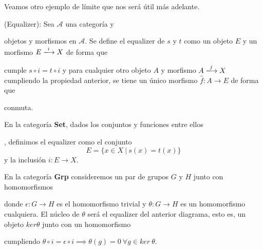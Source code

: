 Veamos otro ejemplo de límite que nos será útil más adelante. 

\begin{definicion}
    (Equalizer): Sea $\mathscr{A}$ una categoría y  objetos y morfismos en $\mathscr{A}$. Se define el equalizer de $s$ y $t$ como un objeto $E$ y un morfismo $E \xlongrightarrow{i} X$ de forma que   cumple $s \circ i = t \circ i$ y para cualquier otro objeto $A$ y morfismo $A \xlongrightarrow{j} X$ cumpliendo la propiedad anterior, se tiene un único morfismo $\hat{f}: A \longrightarrow E$ de forma que

    \begin{center}
    \end{center}
    conmuta.
\end{definicion}

\begin{ejemplo}
    En la categoría \textbf{Set}, dados los conjuntos y funciones entre ellos , definimos el equalizer como el conjunto \begin{equation}
        E = \{x \in X \ | \ s(x) = t(x)\}
    \end{equation} y la inclusión $i: E \longrightarrow X$. 
\end{ejemplo}

\begin{ejemplo}
    En la categoría \textbf{Grp} consideremos un par de grupos $G$ y $H$ junto con homomorfismos  donde $\epsilon: G \longrightarrow H$ es el homomorfismo trivial y $\theta: G \longrightarrow H$ es un homomorfismo cualquiera. El núcleo de $\theta$ será el equalizer del anterior diagrama, esto es, un objeto $ker \theta$ junto con un homomorfismo  cumpliendo $\theta \circ i = \epsilon \circ i \implies \theta(g) = 0 \ \forall g \in ker \ \theta $.
\end{ejemplo}


